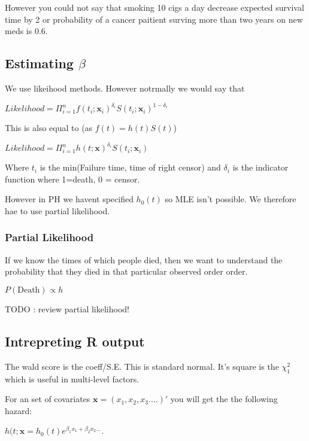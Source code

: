\documentclass[
  letterpaper,
  DIV=11,
  numbers=noendperiod]{scrreprt}
\begin{document}
However you could not say that smoking 10 cigs a day decrease expected
survival time by 2 or probability of a cancer paitient surving more than
two years on new meds is 0.6.

\hypertarget{estimating-beta}{%
\subsection{\texorpdfstring{Estimating
\(\beta\)}{Estimating \textbackslash beta}}\label{estimating-beta}}

We use likeihood methods. However notrmally we would say that

\(Likelihood = \Pi^n_{i=1} f(t_i;\textbf{x}_i)^{\delta_i} S(t_i ; \textbf{x}_i)^{1-\delta_i}\)

This is also equal to (as \(f(t) = h(t)S(t)\))

\(Likelihood = \Pi^n_{i=1} h(t;\textbf{x})^{\delta_i} S(t_i ; \textbf{x}_i)\)

Where \(t_i\) is the min(Failure time, time of right censor) and
\(\delta_i\) is the indicator function where 1=death, 0 = censor.

However in PH we havent specified \(h_0(t)\) so MLE isn't possible. We
therefore hae to use partial likelihood.

\hypertarget{partial-likelihood}{%
\subsubsection{Partial Likelihood}\label{partial-likelihood}}

If we know the times of which people died, then we want to understand
the probability that they died in that particular observed order order.

\(P(\text{Death}) \propto h\)

TODO : review partial likelihood!

\hypertarget{intrepreting-r-output}{%
\subsection{Intrepreting R output}\label{intrepreting-r-output}}

The wald score is the coeff/S.E. This is standard normal. It's square is
the \(\chi^2_1\) which is useful in multi-level factors.

For an set of covariates \(\textbf{x} = (x_1, x_2, x_3....)'\) you will
get the the following hazard:

\(h(t;\textbf{x} = h_0(t)e^{\beta_1 x_1 + \beta_2 x_2 ...}\).
\end{document}
